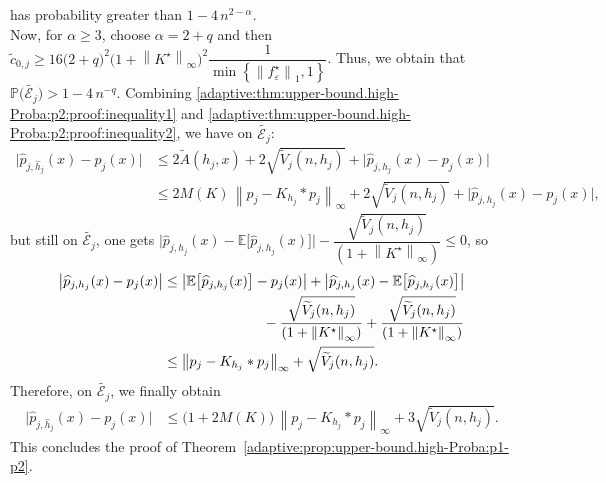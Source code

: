 \documentclass[11pt,a4paper,openany]{article}
\def\E{\mathbb{E}}
\begin{document}
	has probability greater than $1 - 4 \, n^{2 - \alpha}$. 
	\leavevmode \\
	Now, for $\alpha  \geq  3$, choose $\alpha = 2 + q$ and then $\tilde c_{0,j} \geq 16 \big(2 + q \big)^{2} \big( 1 + \left\| K^{\star} \right\|_{\infty} \big)^{2}  \dfrac{1}{ \min  \left\{     \left\| f_{\varepsilon}^{\star} \right\|_{1}      , 1  \right\} }  $. Thus, we obtain that $\mathbb{P} \big( \widetilde {\mathcal {E}_{j}  } \big) > 1 - 4  \,  n^{-q} $.
	Combining  \eqref{adaptive:thm:upper-bound.high-Proba:p2:proof:inequality1} and \eqref{adaptive:thm:upper-bound.high-Proba:p2:proof:inequality2}, we have on $\widetilde {\mathcal {E}_j  }$:
	\begin{align*}
		\big| \widehat{p}_{j,\widehat{h}_{j}}(x)  -  p_{j}(x) \big|   &\leq   2    \widetilde A(h_{j},x)   +   2    \sqrt{\widetilde{V}_{j}(n,h_{j})}  +   \big|  \widehat{p}_{j, h_{j}}(x)   -   p_{j}(x) \big|    
		\\
		&\leq 2 M(K) \, %
		\left\| p_{j} - K_{h_{j}} \ast  p_{j}   \right\|_{\infty}    
		+  2   \sqrt{\widetilde{V}_{j}(n,h_{j})}  
		+   \big|  \widehat{p}_{j, h_{j}}(x) - p_{j}(x) \big| ,
	\end{align*}
	but still on $\widetilde {\mathcal {E}_j  }$, one gets $\big| \widehat{p}_{j , h_{j}}(x) - \E \big[\widehat{p}_{j , h_{j}}(x)\big] \big|  -   \dfrac{\sqrt{\widetilde{V}_{j}(n , h_{j})}}{ (1 + \left\| K^{\star} \right\|_{\infty } ) } \leq 0$, so
	\begin{align*}
		\big| \widehat{p}_{j,h_{j}}(x)   -   p_{j}(x) \big|   &\leq  \big| \E \big[\widehat{p}_{j,h_{j}}(x)\big]   -    p_{j}(x) \big|  +  \big| \widehat{p}_{j,h_{j}}(x) - \E \big[\widehat{p}_{j,h_{j}}(x)\big] \big|  
		\\ & \hspace{2.5cm}
		-  \dfrac{\sqrt{\widetilde{V}_{j}(n,h_{j})}}{ (1 + \left\| K^{\star}  \right\|_{\infty} ) } 
		+  \dfrac{\sqrt{\widetilde{V}_{j}(n,h_{j})}}{ (1 + \left\| K^{\star} \right\|_{\infty} ) }
		\\
		&\leq   %
		\left\| p_{j} - K_{h_{j}} \ast  p_{j}   \right\|_{\infty}
		+    \sqrt{\widetilde{V}_{j}(n,h_{j})}.   
	\end{align*}
	Therefore, on $\widetilde {\mathcal {E}_j }$, we finally obtain
	\begin{align*}
		\big| \widehat{p}_{j,\widehat{h}_{j}}(x)   -    p_{j}(x) \big|   &\leq   %
		\big( 1 + 2 M(K) \big) \, %
		\left\| p_{j} - K_{h_{j}} \ast  p_{j}   \right\|_{\infty}
		+  3  \sqrt{\widetilde{V}_{j}(n,h_{j})} .
	\end{align*}
	This concludes the proof of Theorem~\ref{adaptive:prop:upper-bound.high-Proba:p1-p2}.
\end{document}
